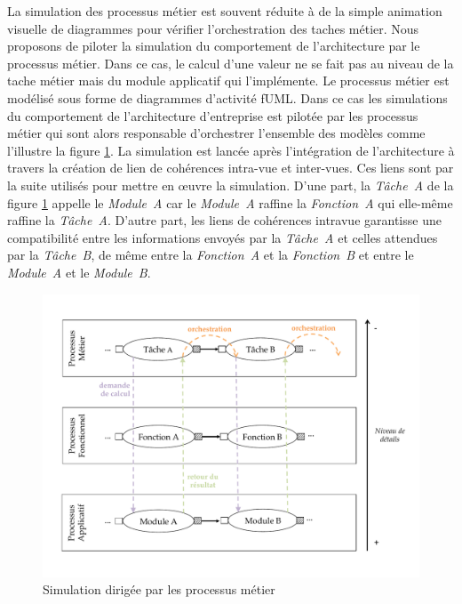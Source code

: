 La simulation des processus métier est souvent réduite à de la simple animation visuelle de diagrammes pour vérifier l'orchestration des taches métier. Nous proposons de piloter la simulation du comportement de l'architecture par le processus métier. Dans ce cas, le calcul d'une valeur ne se fait pas au niveau de la tache métier mais du module applicatif qui l'implémente. Le processus métier est modélisé sous forme de diagrammes d'activité fUML. Dans ce cas les simulations du comportement de l'architecture d'entreprise est pilotée par les processus métier qui sont alors responsable d'orchestrer l'ensemble des modèles comme l'illustre la figure \ref{fig:Simulation_Approche}. La simulation est lancée après l'intégration de l'architecture à travers la création de lien de cohérences intra-vue et inter-vues. Ces liens sont par la suite utilisés pour mettre en œuvre la simulation. D'une part, la \textit{Tâche~A} de la figure \ref{fig:Simulation_Approche} appelle le \textit{Module~A} car le \textit{Module~A} raffine la \textit{Fonction~A} qui elle-même raffine la \textit{Tâche~A}. D'autre part, les liens de cohérences intravue garantisse une compatibilité entre les informations envoyés par la \textit{Tâche~A} et celles attendues par la \textit{Tâche~B}, de même entre la \textit{Fonction~A} et la \textit{Fonction~B} et entre le \textit{Module~A} et le \textit{Module~B}.
\begin{figure}[!htbp]
 \begin{center}
  \includegraphics[trim= 0cm 2cm 0cm 0cm, width=1\textwidth]{figures/images/demarche/approche_simulation.pdf}
 \end{center}
 \caption{Simulation dirigée par les processus métier}
 \label{fig:Simulation_Approche}
\end{figure}

